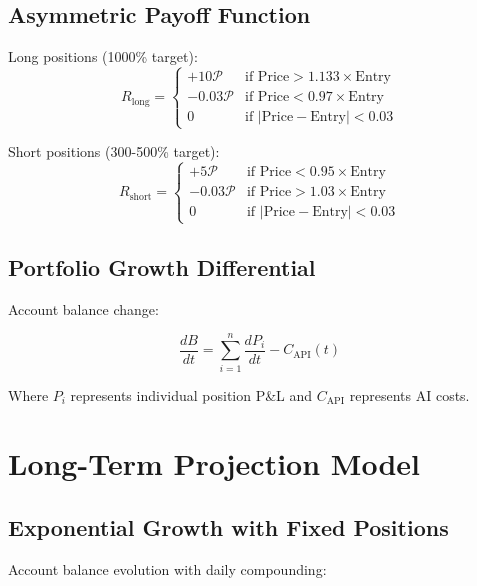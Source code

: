 \documentclass{article}
\begin{document}
\subsection{Asymmetric Payoff Function}

Long positions (1000\% target):
\begin{equation}
R_{\text{long}} =
\begin{cases}
+10\mathcal{P} & \text{if } \text{Price} > 1.133 \times \text{Entry} \\
-0.03\mathcal{P} & \text{if } \text{Price} < 0.97 \times \text{Entry} \\
0 & \text{if } | \text{Price} - \text{Entry} | < 0.03
\end{cases}
\end{equation}

Short positions (300-500\% target):
\begin{equation}
R_{\text{short}} =
\begin{cases}
+5\mathcal{P} & \text{if } \text{Price} < 0.95 \times \text{Entry} \\
-0.03\mathcal{P} & \text{if } \text{Price} > 1.03 \times \text{Entry} \\
0 & \text{if } | \text{Price} - \text{Entry} | < 0.03
\end{cases}
\end{equation}

\subsection{Portfolio Growth Differential}

Account balance change:

\begin{equation}
\frac{dB}{dt} = \sum_{i=1}^{n} \frac{dP_i}{dt} - C_{\text{API}}(t)
\end{equation}

Where $P_i$ represents individual position P\&L and $C_{\text{API}}$ represents AI costs.

\section{Long-Term Projection Model}

\subsection{Exponential Growth with Fixed Positions}

Account balance evolution with daily compounding:
\end{document}
